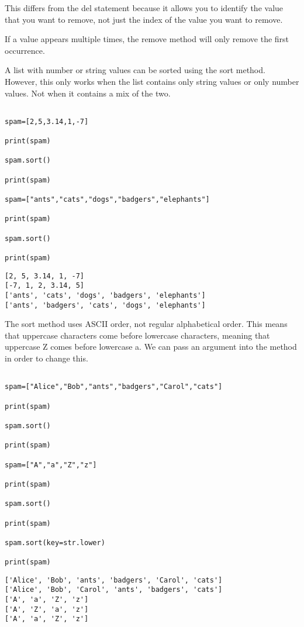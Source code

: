 \documentclass[11pt]{article}
\begin{document}
This differs from the del statement because it allows you to identify the value that you want to remove, not just the index of the value you want to remove.

If a value appears multiple times, the remove method will only remove the first occurrence.

A list with number or string values can be sorted using the sort method. However, this only works when the list contains only string values or only number values. Not when it contains a mix of the two.

\begin{verbatim}

spam=[2,5,3.14,1,-7]

print(spam)

spam.sort()

print(spam)

spam=["ants","cats","dogs","badgers","elephants"]

print(spam)

spam.sort()

print(spam)

\end{verbatim}

\begin{verbatim}
[2, 5, 3.14, 1, -7]
[-7, 1, 2, 3.14, 5]
['ants', 'cats', 'dogs', 'badgers', 'elephants']
['ants', 'badgers', 'cats', 'dogs', 'elephants']
\end{verbatim}



The sort method uses ASCII order, not regular alphabetical order. This means that uppercase characters come before lowercase characters, meaning that uppercase Z comes before lowercase a. We can pass an argument into the method in order to change this.

\begin{verbatim}

spam=["Alice","Bob","ants","badgers","Carol","cats"]

print(spam)

spam.sort()

print(spam)

spam=["A","a","Z","z"]

print(spam)

spam.sort()

print(spam)

spam.sort(key=str.lower)

print(spam)

\end{verbatim}

\begin{verbatim}
['Alice', 'Bob', 'ants', 'badgers', 'Carol', 'cats']
['Alice', 'Bob', 'Carol', 'ants', 'badgers', 'cats']
['A', 'a', 'Z', 'z']
['A', 'Z', 'a', 'z']
['A', 'a', 'Z', 'z']
\end{verbatim}
\end{document}
